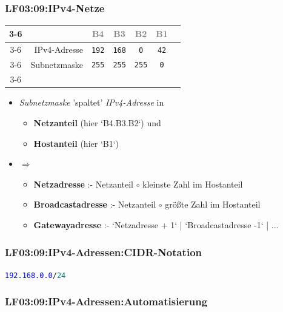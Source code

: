 \begin{frame}[fragile]  
  \frametitle{LF03:09:IPv4-Netze}
  \vspace{0.2cm}
  \begin{footnotesize}
  \begin{center}
    \renewcommand{\arraystretch}{1.3}
    \begin{tabular}{cr|c|c|c|c|c|}
    \cline{3-6}
    & &  \textcolor{gray}{\tiny{B4}} & \textcolor{gray}{\tiny{B3}} & \textcolor{gray}{\tiny{B2}} 
    &  \textcolor{gray}{\tiny{B1}}  \\
	  \cline{3-6}
	  & IPv4-Adresse & \texttt{192} & \texttt{168} & \texttt{0} & \texttt{42} \\
    \cline{3-6}
    & Subnetzmaske & \texttt{255} & \texttt{255} & \texttt{255} & \texttt{0}\\
    \cline{3-6}
  \end{tabular}
\end{center}


\vspace{0.2cm}

  \begin{itemize}
    \item \textit{Subnetzmaske} 'spaltet' \textit{IPv4-Adresse} in 

    \begin{itemize}
      \item \footnotesize{\textbf{Netzanteil} (hier `B4.B3.B2`) und}
      \item \textbf{Hostanteil} (hier `B1`)
    \end{itemize}
    \item $\Rightarrow$
    \begin{itemize}
      \item \textbf{Netzadresse} :- Netzanteil $\circ$ kleinste Zahl im Hostanteil 
      \item \textbf{Broadcastadresse} :-  Netzanteil $\circ$  größte Zahl im Hostanteil 
      \item \textbf{Gatewayadresse}  :- `Netzadresse + 1`  | `Broadcastadresse -1` | ...
    \end{itemize}
  \end{itemize}
\end{footnotesize}
\end{frame}


\begin{frame}[fragile]  
  \frametitle{LF03:09:IPv4-Adressen:CIDR-Notation}

  \vspace{1cm}
\begin{center}
\huge{
  \texttt{\textcolor{blue}{192.168.0.0}/\textcolor{teal}{24}}
}
\end{center}

\end{frame}

\begin{frame}[fragile]  
  \frametitle{LF03:09:IPv4-Adressen:Automatisierung}

    \begin{center}
    \begin{minipage}{0.9\textwidth}
      \inputminted[fontsize=\footnotesize,linenos]{python}{\snpLf/dm-0309-nw-rule-verification.py}
    \end{minipage}
    \end{center}
\end{frame}